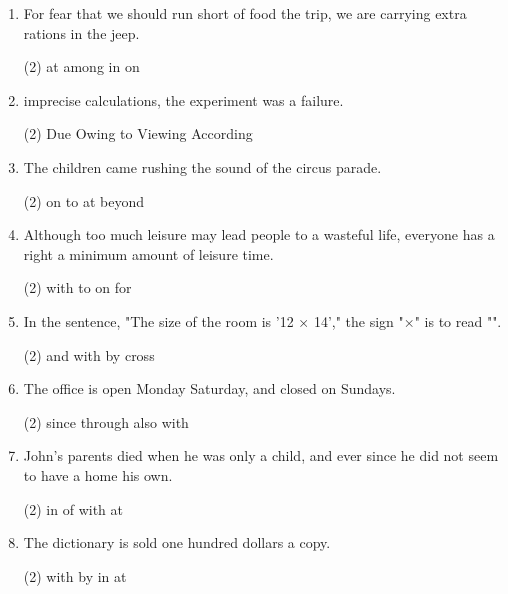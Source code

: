 \begin{enumerate}
\item For fear that we should run short of food \ttu the trip, we are carrying extra rations in the jeep.
  \begin{tasks}(2)
    \task at
    \task among
    \task in
    \task on
  \end{tasks}

\item \ttu imprecise calculations, the experiment was a failure.
  \begin{tasks}(2)
    \task Due
    \task Owing to
    \task Viewing
    \task According
  \end{tasks}

\item The children came rushing \ttu the sound of the circus parade.
  \begin{tasks}(2)
    \task on
    \task to
    \task at
    \task beyond
  \end{tasks}

\item Although too much leisure may lead people to a wasteful life, everyone has
a right \ttu a minimum amount of leisure time.
  \begin{tasks}(2)
    \task with
    \task to
    \task on
    \task for
  \end{tasks}

\item In the sentence, "The size of the room is '12 × 14'," the sign "×" is to read "\ttu".
  \begin{tasks}(2)
    \task and
    \task with
    \task by
    \task cross
  \end{tasks}

\item The office is open Monday \ttu Saturday, and closed on Sundays.
  \begin{tasks}(2)
    \task since
    \task through
    \task also
    \task with
  \end{tasks}

\item John's parents died when he was only a child, and ever since he did not seem to have a home \ttu his own.
  \begin{tasks}(2)
    \task in
    \task of
    \task with
    \task at
  \end{tasks}

\item The dictionary is sold \ttu one hundred dollars a copy.
  \begin{tasks}(2)
    \task with
    \task by
    \task in
    \task at
  \end{tasks}


\end{enumerate}
